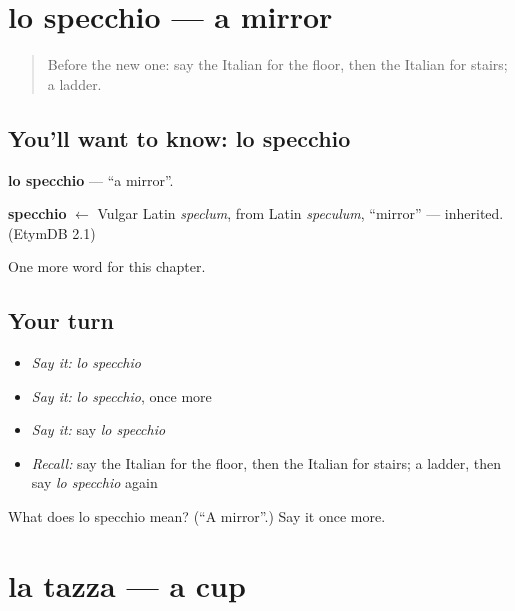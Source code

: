 \section[lo specchio]{lo specchio — a mirror}

\label{lesson:IT-C58-specchio}



\begin{quote}
Before the new one: say the Italian for the floor, then the Italian for stairs; a ladder.
\end{quote}

\subsection*{You'll want to know: lo specchio}
\textbf{lo specchio} — \textquotedblleft{}a mirror\textquotedblright{}.

\begin{cousinweb}
\textbf{specchio} $\leftarrow$ Vulgar Latin \emph{speclum}, from Latin \emph{speculum}, \textquotedblleft{}mirror\textquotedblright{} — inherited. (EtymDB 2.1)
\end{cousinweb}

\begin{grammarlens}[title={What you've built}]
One more word for this chapter.
\end{grammarlens}

\subsection*{Your turn}
\begin{itemize}
\raggedright
  \item \emph{Say it:} \emph{lo specchio}
  \item \emph{Say it:} \emph{lo specchio}, once more
  \item \emph{Say it:} say \emph{lo specchio}
  \item \emph{Recall:} say the Italian for the floor, then the Italian for stairs; a ladder, then say \emph{lo specchio} again
\end{itemize}

\begin{tcolorbox}[breakable,colback=teal!4,colframe=teal!35!black,title={Before you move on}]
What does lo specchio mean? (\textquotedblleft{}A mirror\textquotedblright{}.) Say it once more.
\end{tcolorbox}
\section[la tazza]{la tazza — a cup}

